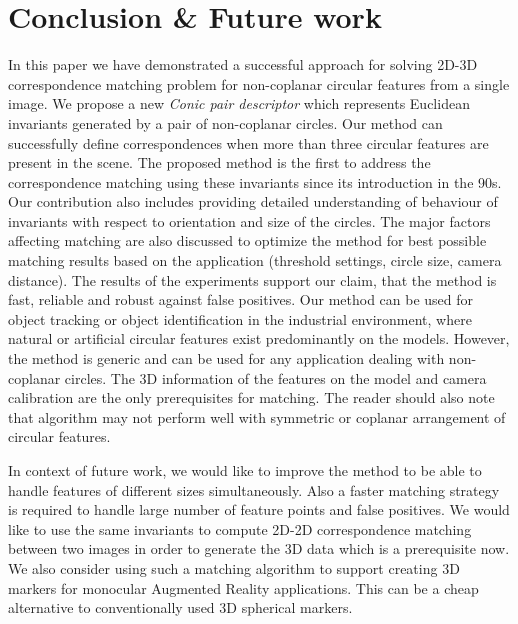 \documentclass{bmvc2k}
\begin{document}
\section{Conclusion \& Future work }
In this paper we have demonstrated a successful approach for solving 2D-3D correspondence matching problem for non-coplanar circular features from a single image. 
We propose a new \textit{Conic pair descriptor} which represents Euclidean invariants generated by a pair of non-coplanar circles.
Our method can successfully define correspondences when more than three circular features are present in the scene. 
The proposed method is the first to address the correspondence matching using these invariants since its introduction in the 90s.
Our contribution also includes providing detailed understanding of behaviour of invariants with respect to orientation and size of the circles. 
The major factors affecting matching are also discussed to optimize the method for best possible matching results based on the application (threshold settings, circle size, camera distance). 
The results of the experiments support our claim, that the method is fast, reliable and robust against false positives.
Our method can be used for object tracking or object identification in the industrial environment, where natural or artificial circular features exist predominantly on the models. 
However, the method is generic and can be used for any application dealing with non-coplanar circles. 
The 3D information of the features on the model and camera calibration are the only prerequisites for matching. 
The reader should also note that algorithm may not perform well with symmetric or coplanar arrangement of circular features. 

\par 
In context of future work, we would like to improve the method to be able to handle features of different sizes simultaneously.
Also a faster matching strategy is required to handle large number of feature points and false positives. We would like to use the same invariants to compute 2D-2D correspondence matching between two images in order to generate the 3D data which is a prerequisite now. We also consider using such a matching algorithm to support creating 3D markers for monocular Augmented Reality applications. This can be a cheap alternative to conventionally used 3D spherical markers.  



\end{document}
